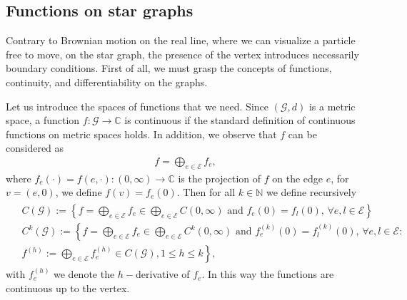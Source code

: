 \documentclass[11pt,a4paper]{article}
\theoremstyle{plain}
\theoremstyle{definition}
\theoremstyle{remark}
\begin{document}
		\subsection{Functions on star graphs}
		Contrary to Brownian motion on the real line, where we can visualize a particle free to move, on the star graph, the presence of the vertex introduces necessarily boundary conditions. First of all, we must grasp the concepts of functions, continuity, and differentiability on the graphs.
		
		Let us introduce the spaces of functions that we need. Since $(\mathcal{G},d)$ is a metric space, a function $f: \mathcal{G} \to \mathbb{C}$ is continuous if the standard definition of continuous functions on metric spaces holds. In addition, we observe that $f$ can be considered as
		\begin{align*}
			f=\bigoplus_{e \in \mathcal{E}} f_e,
		\end{align*}
		where $f_e(\cdot)= f(e,\cdot) : (0,\infty) \to \mathbb{C}$ is the projection of $f$ on the edge $e$, for \(v=(e,0)\), we define \(f(v)=f_e(0)\). Then for all $k \in \mathbb{N}$ we define recursively
		\begin{align*}
			\begin{split}
				&C(\mathcal{G}):=\left\{f=\bigoplus_{e \in \mathcal{E}} f_e \in \bigoplus_{e \in \mathcal{E}} C(0,\infty) \text{ and } f_e(0)=f_l(0), \, \forall e, l \in \mathcal{E}\right\}\\
				&C^k(\mathcal{G}):=\left\{f=\bigoplus_{e \in \mathcal{E}} f_e \in \bigoplus_{e \in \mathcal{E}} C^k(0,\infty) \text{ and } f_e^{(k)}(0)=f_l^{(k)}(0), \, \forall e, l \in \mathcal{E}:\right.
				\\
				&\left. f^{(h)} := \bigoplus_{e \in \mathcal{E}} f^{(h)}_e \in C(\mathcal{G}), 1 \leq h \leq k \right\},
			\end{split}
		\end{align*}
		with $f^{(h)}_e$ we denote the $h-$derivative of $f_e$. In this way the functions are continuous up to the vertex. 
		
\end{document}
